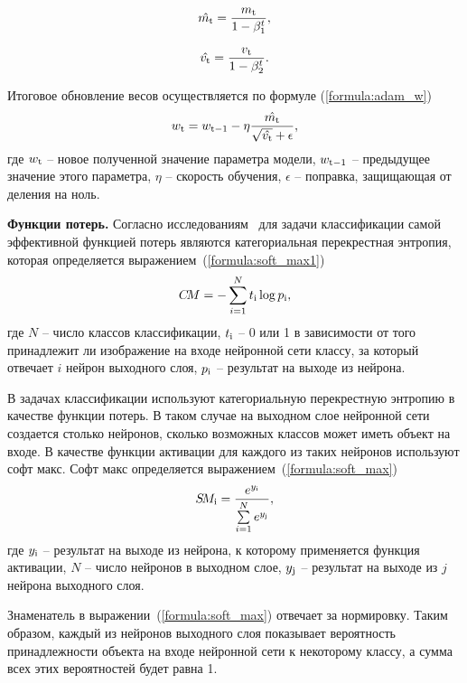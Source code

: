 \begin{equation}\label{formula:adamcorr1}
	\hat{m_{\rm{t}}} = \frac{m_{\rm{t}}}{1 - \beta_{\rm{1}}^t},
\end{equation}

\begin{equation}\label{formula:adamcorr2}
	\hat{v_{\rm{t}}} = \frac{v_{\rm{t}}}{1 - \beta_{\rm{2}}^t}.
\end{equation}

Итоговое обновление весов осуществляется по формуле 
(\ref{formula:adam_w})
\begin{equation}\label{formula:adam_w}
	w_{\rm{t}} = w_{\rm{t-1}} - \eta\frac{\hat{m_{\rm{t}}}}{\sqrt{\hat{v_{\rm{t}}}} + \epsilon},
\end{equation}
где $w_{\rm{t}}$ -- новое полученной значение параметра модели, $w_{\rm{t-1}}$ -- предыдущее значение этого параметра, $\eta$ -- скорость обучения, $\epsilon$ -- поправка, защищающая от деления на ноль.

\textbf{Функции потерь.}
Согласно исследованиям~\cite{loss_function} для задачи классификации самой эффективной функцией потерь являются категориальная перекрестная энтропия, которая определяется выражением~(\ref{formula:soft_max1})
\begin{equation}\label{formula:soft_max1}
C\!M = - \sum\limits_{i = 1}^{N}t_{\rm{i}}\log{p_{\rm{i}}},
\end{equation}
где $N$ -- число классов классификации, $t_{\rm{i}}$ -- 0 или 1 в зависимости от того принадлежит ли изображение на входе нейронной сети классу, за который отвечает $i$ нейрон выходного слоя, $p_{\rm{i}}$ -- результат на выходе из нейрона.

В задачах классификации используют категориальную перекрестную энтропию в качестве функции потерь. 
В таком случае на выходном слое нейронной сети создается столько нейронов, сколько возможных классов может иметь объект на входе.
В качестве функции активации для каждого из таких нейронов используют софт макс. 
Софт макс определяется выражением~(\ref{formula:soft_max})
\begin{equation}\label{formula:soft_max}
S\!M_{\rm{i}} = \frac{e^{y_{\rm{i}}}}{\sum\limits_{i = 1}^{N}e^{y_{\rm{j}}}},
\end{equation}
где $y_{\rm{i}}$ -- результат на выходе из нейрона, к которому применяется функция активации, $N$ -- число нейронов в выходном слое, $y_{\rm{j}}$ -- результат на выходе из $j$ нейрона выходного слоя.

Знаменатель в выражении~(\ref{formula:soft_max}) отвечает за нормировку. 
Таким образом, каждый из нейронов выходного слоя показывает вероятность принадлежности объекта на входе нейронной сети к некоторому классу, а сумма всех этих вероятностей будет равна 1.

